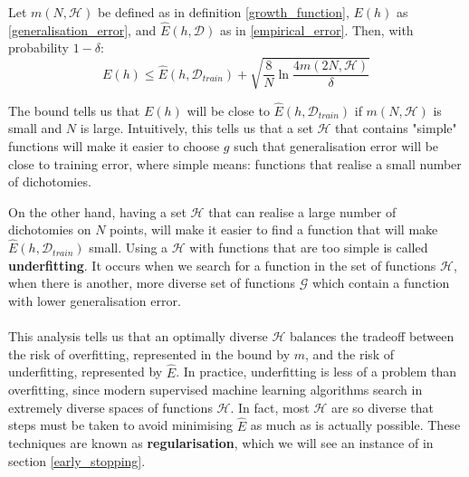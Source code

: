 \begin{theorem}
	\label{vc_bound}
	Let $m(N, \mathcal{H})$ be defined as in definition \ref{growth_function}, $E(h)$ as \ref{generalisation_error}, and $\hat{E}(h, \mathcal{D})$ as in \ref{empirical_error}. Then, with probability $1 - \delta$:
	$$
	E(h) \leq \hat{E}(h, \mathcal{D}_{train}) + \sqrt{\frac{8}{N}\ln \frac{4m(2N, \mathcal{H})}{\delta}}
	$$
\end{theorem}
The bound tells us that $E(h)$ will be close to $\hat{E}(h, \mathcal{D}_{train})$ if $m(N, \mathcal{H})$ is small and $N$ is large. Intuitively, this tells us that a set $\mathcal{H}$ that contains "simple" functions will make it easier to choose $g$ such that generalisation error will be close to training error, where simple means: functions that realise a small number of dichotomies.

On the other hand, having a set $\mathcal{H}$ that can realise a large number of dichotomies on $N$ points, will make it easier to find a function that will make $\hat{E}(h, \mathcal{D}_{train})$ small. Using a $\mathcal{H}$ with functions that are too simple is called \textbf{underfitting}. It occurs when we search for a function in the set of functions $\mathcal{H}$, when there is another, more diverse set of functions $\mathcal{G}$ which contain a function with lower generalisation error.
\\\\
This analysis tells us that an optimally diverse $\mathcal{H}$ balances the tradeoff between the risk of overfitting, represented in the bound by $m$, and the risk of underfitting, represented by $\hat{E}$. In practice, underfitting is less of a problem than overfitting, since modern supervised machine learning algorithms search in extremely diverse spaces of functions $\mathcal{H}$. In fact, most $\mathcal{H}$ are so diverse that steps must be taken to avoid minimising $\hat{E}$ as much as is actually possible. These techniques are known as \textbf{regularisation}, which we will see an instance of in section \ref{early_stopping}.
